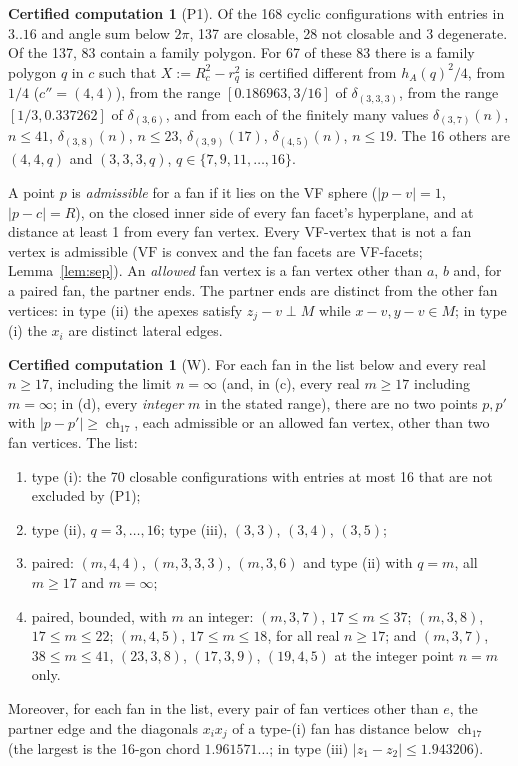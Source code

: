 \documentclass[11pt]{article}
\theoremstyle{definition}
\newtheorem{computation}[theorem]{Certified computation}
\theoremstyle{remark}
\newcommand{\VF}{\mathrm{VF}}
\newcommand{\ch}{\operatorname{ch}}
\begin{document}
\begin{appendices}
\begin{computation}[P1]\label{comp:P1}
Of the 168 cyclic configurations with entries in $3..16$ and angle sum below
$2\pi$, 137 are closable, 28 not closable and 3 degenerate. Of the 137, 83
contain a family polygon. For 67 of these 83 there is a family polygon $q$
in $c$ such that $X:=R_c^2-r_q^2$ is certified different from $h_A(q)^2/4$,
from $1/4$ ($c''=(4,4)$), from the range $[0.186963,3/16]$ of
$\delta_{(3,3,3)}$, from the range $[1/3,0.337262]$ of $\delta_{(3,6)}$, and from
each of the finitely many values $\delta_{(3,7)}(n)$, $n\le41$,
$\delta_{(3,8)}(n)$, $n\le23$, $\delta_{(3,9)}(17)$, $\delta_{(4,5)}(n)$,
$n\le19$. The 16 others are $(4,4,q)$ and $(3,3,3,q)$, $q\in\{7,9,11,\dots,16\}$.
\end{computation}

A point $p$ is \emph{admissible} for a fan if it lies on the VF sphere
($|p-v|=1$, $|p-c|=R$), on the closed inner side of every fan facet's
hyperplane, and at distance at least 1 from every fan vertex. Every
VF-vertex that is not a fan vertex is admissible ($\VF$ is convex and the
fan facets are VF-facets; Lemma~\ref{lem:sep}). An \emph{allowed} fan
vertex is a fan vertex other than $a$, $b$ and, for a paired fan, the
partner ends. The partner ends are distinct from the other fan vertices: in
type (ii) the apexes satisfy $z_j-v\perp M$ while $x-v,y-v\in M$; in type (i) the $x_i$ are distinct
lateral edges.

\begin{computation}[W]\label{comp:W}
For each fan in the list below and every real $n\ge17$, including the
limit $n=\infty$ (and, in (c), every real $m\ge17$ including $m=\infty$;
in (d), every \emph{integer} $m$ in the stated range), there are no two
points $p,p'$ with $|p-p'|\ge\ch_{17}$, each admissible or
an allowed fan vertex, other than two fan vertices. The list:
\begin{enumerate}[label=(\alph*),leftmargin=2em]
\item type (i): the 70 closable configurations with entries at most 16
  that are not excluded by (P1);
\item type (ii), $q=3,\dots,16$; type (iii), $(3,3)$, $(3,4)$, $(3,5)$;
\item paired: $(m,4,4)$, $(m,3,3,3)$, $(m,3,6)$ and type (ii) with $q=m$, all
  $m\ge17$ and $m=\infty$;
\item paired, bounded, with $m$ an integer: $(m,3,7)$, $17\le m\le37$;
  $(m,3,8)$, $17\le m\le22$; $(m,4,5)$, $17\le m\le18$, for all real
  $n\ge17$; and $(m,3,7)$, $38\le m\le41$, $(23,3,8)$, $(17,3,9)$,
  $(19,4,5)$ at the integer point $n=m$ only.
\end{enumerate}
Moreover, for each fan in the list, every pair of fan vertices other than
$e$, the partner edge and the diagonals $x_ix_j$ of a type-(i) fan has
distance below $\ch_{17}$ (the largest is the 16-gon chord $1.961571\ldots$;
in type (iii) $|z_1-z_2|\le1.943206$).
\end{computation}


\end{appendices}
\end{document}
